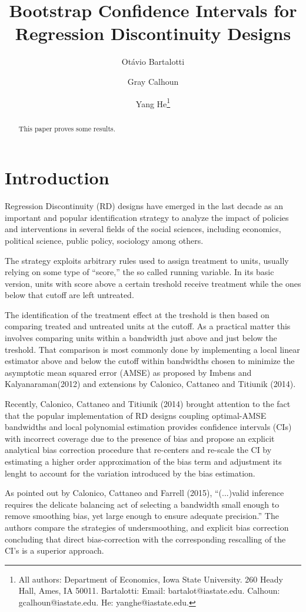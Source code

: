 \documentclass[12pt,fleqn]{article}
\title{Bootstrap Confidence Intervals for Regression Discontinuity Designs}
\author{Ot\'avio Bartalotti \and Gray Calhoun \and Yang He\thanks{All authors: 
Department of Economics, Iowa State University. 260 Heady Hall, Ames, IA  50011.
Bartalotti: Email: bartalot@iastate.edu. Calhoun: gcalhoun@iastate.edu.
He: yanghe@iastate.edu.}}
\begin{document}
\maketitle

\begin{abstract}
This paper proves some results.
\end{abstract}

\section{Introduction}
Regression Discontinuity (RD) designs have emerged in the last decade as an 
important and popular identification strategy to analyze the impact of policies
and interventions in several fields of the social sciences, including economics,
political science, public policy, sociology among others.

The strategy exploits arbitrary rules used to assign treatment to units, usually
relying on some type of ``score,'' the so called running variable. In its basic 
version, units with score above a certain treshold receive treatment while the 
ones below that cutoff are left untreated.

The identification of the treatment effect at the treshold is then based on 
comparing treated and untreated units at the cutoff. As a practical matter this 
involves comparing units within a bandwidth just above and just below the 
treshold. That comparison is most commonly done by implementing a local linear
estimator above and below the cutoff within bandwidths chosen to minimize the 
asymptotic mean squared error (AMSE) as proposed by Imbens and Kalyanaraman(2012)
and extensions by Calonico, Cattaneo and Titiunik (2014).

Recently, Calonico, Cattaneo and Titiunik (2014) brought attention to the fact
that the popular implementation of RD designs coupling optimal-AMSE bandwidths
and local polynomial estimation provides confidence intervals (CIs) with
incorrect coverage due to the presence of bias and propose an explicit analytical
bias correction procedure that re-centers and re-scale the CI by estimating a higher 
order approximation of the bias term and adjustment its lenght to account for 
the variation introduced by the bias estimation.

As pointed out by Calonico, Cattaneo and Farrell (2015), ``(...)valid inference
requires the delicate balancing act of selecting a bandwidth small enough
to remove smoothing bias, yet large enough to ensure adequate precision.''
The authors compare the strategies of undersmoothing, and explicit bias 
correction concluding that direct bias-correction with the corresponding 
rescalling of the CI's is a superior approach.
\end{document}
